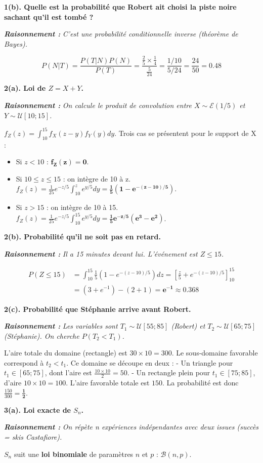 \documentclass[11pt,a4paper]{article}
\newcommand{\raisonnement}[1]{
    \vspace{0.2cm}
    \noindent\textcolor{blue!80!black}{
        \textbf{\textit{Raisonnement : }} \textit{#1}
    }
    \vspace{0.2cm}
}
\begin{document}
\textbf{1(b). Quelle est la probabilité que Robert ait choisi la piste noire sachant qu'il est tombé ?}
\raisonnement{C'est une probabilité conditionnelle inverse (théorème de Bayes).}
$$ P(N|T) = \frac{P(T|N)P(N)}{P(T)} = \frac{\frac{2}{5} \times \frac{1}{4}}{\frac{5}{24}} = \frac{1/10}{5/24} = \frac{24}{50} = \mathbf{0.48} $$

\textbf{2(a). Loi de $Z = X+Y$.}
\raisonnement{On calcule le produit de convolution entre $X \sim \mathcal{E}(1/5)$ et $Y \sim \mathcal{U}[10; 15]$.}
$f_Z(z) = \int_{10}^{15} f_X(z-y)f_Y(y) dy$. Trois cas se présentent pour le support de X :
\begin{itemize}
    \item Si $z < 10$ : $\mathbf{f_Z(z) = 0}$.
    \item Si $10 \le z \le 15$ : on intègre de 10 à z. $f_Z(z) = \frac{1}{25} e^{-z/5} \int_{10}^z e^{y/5} dy = \mathbf{\frac{1}{5} \left( 1 - e^{-(z-10)/5} \right)}$.
    \item Si $z > 15$ : on intègre de 10 à 15. $f_Z(z) = \frac{1}{25} e^{-z/5} \int_{10}^{15} e^{y/5} dy = \mathbf{\frac{1}{5} e^{-z/5} \left( e^3 - e^2 \right)}$.
\end{itemize}

\textbf{2(b). Probabilité qu'il ne soit pas en retard.}
\raisonnement{Il a 15 minutes devant lui. L'événement est $Z \le 15$.}
\begin{align*}
P(Z \le 15) &= \int_{10}^{15} \frac{1}{5} \left( 1 - e^{-(z-10)/5} \right) dz = \left[ \frac{z}{5} + e^{-(z-10)/5} \right]_{10}^{15} \\
&= \left( 3 + e^{-1} \right) - (2 + 1) = \mathbf{e^{-1}} \approx 0.368
\end{align*}

\textbf{2(c). Probabilité que Stéphanie arrive avant Robert.}
\raisonnement{Les variables sont $T_1 \sim \mathcal{U}[55; 85]$ (Robert) et $T_2 \sim \mathcal{U}[65; 75]$ (Stéphanie). On cherche $P(T_2 < T_1)$.}
L'aire totale du domaine (rectangle) est $30 \times 10 = 300$.
Le sous-domaine favorable correspond à $t_2 < t_1$. Ce domaine se découpe en deux :
- Un triangle pour $t_1 \in [65; 75]$, dont l'aire est $\frac{10 \times 10}{2} = 50$.
- Un rectangle plein pour $t_1 \in [75; 85]$, d'aire $10 \times 10 = 100$.
L'aire favorable totale est $150$. La probabilité est donc $\frac{150}{300} = \mathbf{\frac{1}{2}}$.

\textbf{3(a). Loi exacte de $S_n$.}
\raisonnement{On répète n expériences indépendantes avec deux issues (succès = skis Castafiore).}
$S_n$ suit une \textbf{loi binomiale} de paramètres $n$ et $p$ : $\mathcal{B}(n, p)$.
\end{document}
